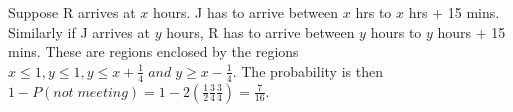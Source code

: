 \documentclass[../../probability-notes.tex]{subfiles}
\begin{document}
Suppose R arrives at $x$ hours. J has to arrive between $x$ hrs to $x$ hrs + 15 mins. Similarly if J arrives at $y$ hours, R has to arrive between $y$ hours to $y$ hours + 15 mins. These are regions enclosed by the regions $x \leq 1, y \leq 1, y \leq x + \frac{1}{4} \;and\; y \geq x - \frac{1}{4}$. The probability is then $ 1 - P(not\;meeting) = 1 - 2(\frac{1}{2} \frac{3}{4} \frac{3}{4}) = \frac{7}{16}$.
\end{document}
